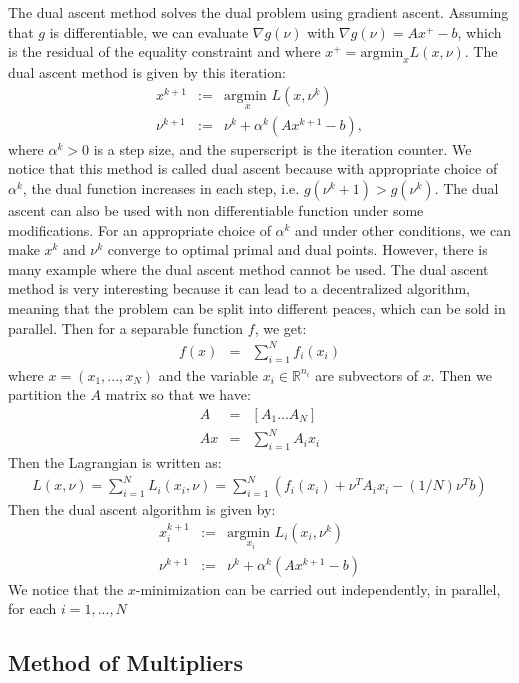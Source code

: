\itshape\documentclass{article}
\begin{document}
The dual ascent method solves the dual problem using gradient ascent. Assuming that $g$ is differentiable, we can evaluate $\nabla g(\nu)$ with $\nabla g(\nu) = Ax^+ - b$, which is the residual of the equality constraint and where $x^+ = \text{argmin}_x L(x, \nu)$. The dual ascent method is given by this iteration:
\begin{eqnarray*}
x^{k+1} &:=& \underset{x}{\text{argmin }} L(x, \nu^k) \\
\nu^{k+1} &:=& \nu^k + \alpha^k (A x^{k+1} - b),
\end{eqnarray*}
where $\alpha^k > 0$ is a step size, and the superscript is the iteration counter. We notice that this method is called dual ascent because with appropriate choice of $\alpha^k$, the dual function increases in each step, i.e. $g(\nu^k+1) > g(\nu^k)$. The dual ascent can also be used with non differentiable function under some modifications.
For an appropriate choice of $\alpha^k$ and under other conditions, we can make $x^k$ and $\nu^k$ converge to optimal primal and dual points. However, there is many example where the dual ascent method cannot be used.
The dual ascent method is very interesting because it can lead to a decentralized algorithm, meaning that the problem can be split into different peaces, which can be sold in parallel. Then for a separable function $f$, we get:
\begin{eqnarray*}
f(x) &=& \sum\limits_{i=1}^N f_i(x_i)
\end{eqnarray*}
where $x = (x_1,...,x_N)$ and the variable $x_i \in \mathbb{R}^{n_i}$ are subvectors of $x$. Then we partition the $A$ matrix so that we have:
\begin{eqnarray*}
A &=& [A_1 ... A_N] \\
Ax &=& \sum\limits_{i=1}^N A_ix_i
\end{eqnarray*}
Then the Lagrangian is written as:
\begin{eqnarray*}
L(x, \nu) = \sum\limits_{i=1}^N L_i(x_i, \nu) = \sum\limits_{i=1}^N (f_i(x_i) + \nu^TA_ix_i - (1/N)\nu^Tb)
\end{eqnarray*}
Then the dual ascent algorithm is given by:
\begin{eqnarray*}
x_i^{k+1} &:=& \underset{x_i}{\text{argmin }} L_i(x_i, \nu^k)\\
\nu^{k+1} &:=& \nu^k + \alpha^k(Ax^{k+1} - b)
\end{eqnarray*}
We notice that the $x$-minimization can be carried out independently, in parallel, for each $i=1,...,N$

\subsection{Method of Multipliers}
	\label{Method of Multipliers}
	
\end{document}
